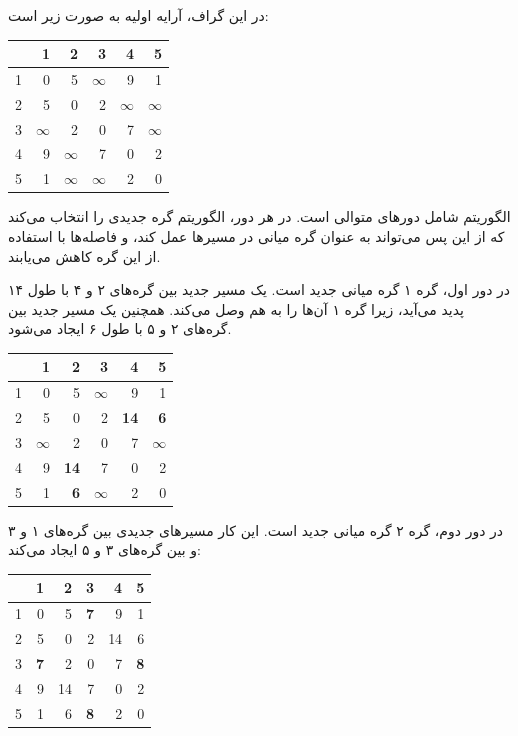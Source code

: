 در این گراف، آرایه اولیه به صورت زیر است:
\begin{center}
\begin{tabular}{r|rrrrr}
 & 1 & 2 & 3 & 4 & 5 \\
\hline
1 & 0 & 5 & $\infty$ & 9 & 1 \\
2 & 5 & 0 & 2 & $\infty$ & $\infty$ \\
3 & $\infty$ & 2 & 0 & 7 & $\infty$ \\
4 & 9 & $\infty$ & 7 & 0 & 2 \\
5 & 1 & $\infty$ & $\infty$ & 2 & 0 \\
\end{tabular}
\end{center}
\vspace{10pt}
الگوریتم شامل دورهای متوالی است. در هر دور، الگوریتم گره جدیدی را انتخاب می‌کند که از این پس می‌تواند به عنوان گره میانی در مسیرها عمل کند، و فاصله‌ها با استفاده از این گره کاهش می‌یابند.

در دور اول، گره ۱ گره میانی جدید است. یک مسیر جدید بین گره‌های ۲ و ۴ با طول ۱۴ پدید می‌آید، زیرا گره ۱ آن‌ها را به هم وصل می‌کند. همچنین یک مسیر جدید بین گره‌های ۲ و ۵ با طول ۶ ایجاد می‌شود.

\begin{center}
\begin{tabular}{r|rrrrr}
 & 1 & 2 & 3 & 4 & 5 \\
\hline
1 & 0 & 5 & $\infty$ & 9 & 1 \\
2 & 5 & 0 & 2 & \textbf{14} & \textbf{6} \\
3 & $\infty$ & 2 & 0 & 7 & $\infty$ \\
4 & 9 & \textbf{14} & 7 & 0 & 2 \\
5 & 1 & \textbf{6} & $\infty$ & 2 & 0 \\
\end{tabular}
\end{center}
\vspace{10pt}

در دور دوم، گره ۲ گره میانی جدید است. این کار مسیرهای جدیدی بین گره‌های ۱ و ۳ و بین گره‌های ۳ و ۵ ایجاد می‌کند:

\begin{center}
\begin{tabular}{r|rrrrr}
 & 1 & 2 & 3 & 4 & 5 \\
\hline
1 & 0 & 5 & \textbf{7} & 9 & 1 \\
2 & 5 & 0 & 2 & 14 & 6 \\
3 & \textbf{7} & 2 & 0 & 7 & \textbf{8} \\
4 & 9 & 14 & 7 & 0 & 2 \\
5 & 1 & 6 & \textbf{8} & 2 & 0 \\
\end{tabular}
\end{center}
\vspace{10pt}

